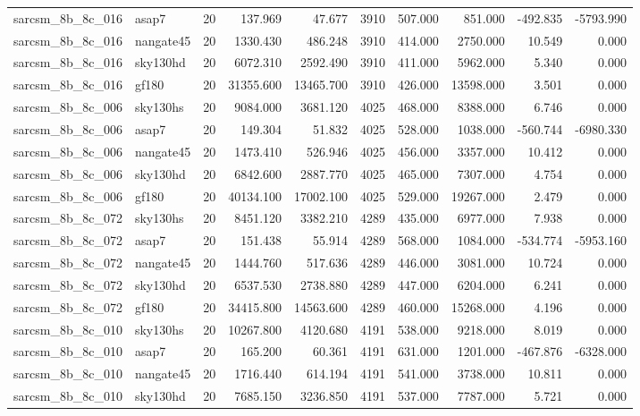 \begin{longtable}{llrrrrrrrr}
sarcsm\_8b\_8c\_016 & asap7 & 20 & 137.969 & 47.677 & 3910 & 507.000 & 851.000 & -492.835 & -5793.990 \\
sarcsm\_8b\_8c\_016 & nangate45 & 20 & 1330.430 & 486.248 & 3910 & 414.000 & 2750.000 & 10.549 & 0.000 \\
sarcsm\_8b\_8c\_016 & sky130hd & 20 & 6072.310 & 2592.490 & 3910 & 411.000 & 5962.000 & 5.340 & 0.000 \\
sarcsm\_8b\_8c\_016 & gf180 & 20 & 31355.600 & 13465.700 & 3910 & 426.000 & 13598.000 & 3.501 & 0.000 \\
sarcsm\_8b\_8c\_006 & sky130hs & 20 & 9084.000 & 3681.120 & 4025 & 468.000 & 8388.000 & 6.746 & 0.000 \\
sarcsm\_8b\_8c\_006 & asap7 & 20 & 149.304 & 51.832 & 4025 & 528.000 & 1038.000 & -560.744 & -6980.330 \\
sarcsm\_8b\_8c\_006 & nangate45 & 20 & 1473.410 & 526.946 & 4025 & 456.000 & 3357.000 & 10.412 & 0.000 \\
sarcsm\_8b\_8c\_006 & sky130hd & 20 & 6842.600 & 2887.770 & 4025 & 465.000 & 7307.000 & 4.754 & 0.000 \\
sarcsm\_8b\_8c\_006 & gf180 & 20 & 40134.100 & 17002.100 & 4025 & 529.000 & 19267.000 & 2.479 & 0.000 \\
sarcsm\_8b\_8c\_072 & sky130hs & 20 & 8451.120 & 3382.210 & 4289 & 435.000 & 6977.000 & 7.938 & 0.000 \\
sarcsm\_8b\_8c\_072 & asap7 & 20 & 151.438 & 55.914 & 4289 & 568.000 & 1084.000 & -534.774 & -5953.160 \\
sarcsm\_8b\_8c\_072 & nangate45 & 20 & 1444.760 & 517.636 & 4289 & 446.000 & 3081.000 & 10.724 & 0.000 \\
sarcsm\_8b\_8c\_072 & sky130hd & 20 & 6537.530 & 2738.880 & 4289 & 447.000 & 6204.000 & 6.241 & 0.000 \\
sarcsm\_8b\_8c\_072 & gf180 & 20 & 34415.800 & 14563.600 & 4289 & 460.000 & 15268.000 & 4.196 & 0.000 \\
sarcsm\_8b\_8c\_010 & sky130hs & 20 & 10267.800 & 4120.680 & 4191 & 538.000 & 9218.000 & 8.019 & 0.000 \\
sarcsm\_8b\_8c\_010 & asap7 & 20 & 165.200 & 60.361 & 4191 & 631.000 & 1201.000 & -467.876 & -6328.000 \\
sarcsm\_8b\_8c\_010 & nangate45 & 20 & 1716.440 & 614.194 & 4191 & 541.000 & 3738.000 & 10.811 & 0.000 \\
sarcsm\_8b\_8c\_010 & sky130hd & 20 & 7685.150 & 3236.850 & 4191 & 537.000 & 7787.000 & 5.721 & 0.000 \\

\end{longtable}
